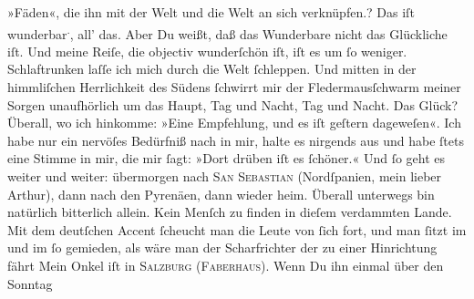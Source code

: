 \begin{ledgroupsized}[t]{13cm}
{{{                     »Fäden«, die ihn mit der Welt und die Welt an sich
                  verknüpfen.}}}\label{K_L02701-5h}?\pend
           \pstart
           Das iſt wunderbar\substVorne{}\textsuperscript{.}\substDazwischen{},\substHinten{} all’ das. Aber Du {\pb}weißt, daß das
               Wunderbare nicht das Glückliche iſt. Und meine Reiſe, die objectiv wunderſchön iſt,
               iſt es \label{T_L02701-12v}\label{T_L02701-12h} um ſo weniger. Schlaftrunken laſſe ich mich durch die Welt
               ſchleppen. Und mitten in\strikeout{\textcolor{gray}{s}} der himmliſchen Herrlichkeit des Südens ſchwirrt mir der Fledermausſchwarm
               meiner Sorgen unaufhörlich um das Haupt, Tag und Nacht, Tag und Nacht. Das Glück?
               Überall, wo ich hinkomme: »Eine Empfehlung, {\pb}und es
               iſt geſtern dageweſen«. Ich habe nur ein nervöſes Bedürfniß nach \label{K_L02701-2v}\label{K_L02701-2h} in mir, halte es
               nirgends aus und habe ſtets eine Stimme in mir, die mir ſagt: »Dort drüben iſt es
               ſchöner.« Und ſo geht es weiter und weiter: übermorgen
               nach \textsc{San Sebastian} (Nordſpanien, mein lieber Arthur), dann
               nach den Pyrenäen, dann wieder heim. Überall
               unterwegs bin natürlich {\pb}bitterlich allein. Kein
               Menſch zu finden in dieſem verdammten Lande. Mit dem deutſchen Accent ſcheucht man
               die Leute von ſich fort,  und man ſitzt im \label{K_L02701-3v}\label{K_L02701-3h} und im \label{T_L02701-3v}\label{T_L02701-3h} ſo
               gemieden, als wäre man der Scharfrichter der zu einer Hinrichtung fährt{\dotsfour}\pend
           \pstart
           Mein Onkel iſt in \textsc{Salzburg} (\textsc{Faberhaus}). {\pb}Wenn Du ihn einmal über den Sonntag

\end{ledgroupsized}

